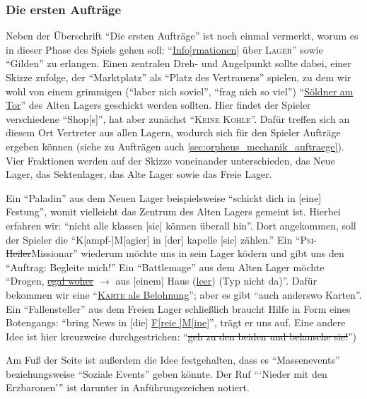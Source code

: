 \documentclass[a5paper,pagesize,numbers=noenddot]{scrbook}
\begin{document}
\subsubsection{Die ersten Aufträge}\label{sec:orpheus_geschichte_abschnitte_auftraege}
Neben der Überschrift \enquote{Die ersten Aufträge} ist noch einmal vermerkt, worum es in dieser Phase des Spiels gehen soll:
\enquote{\uline{Info[rmationen]} über \textsc{Lager}} sowie \enquote{Gilden} zu erlangen.
Einen zentralen Dreh- und Angelpunkt sollte dabei, einer Skizze zufolge, der \enquote{Marktplatz} als \enquote{Platz des Vertrauens} spielen, zu dem wir wohl von einem grimmigen (\enquote{laber nich soviel}, \enquote{frag nich so viel}) \enquote{\uline{Söldner am Tor}} des Alten Lagers geschickt werden sollten.
Hier findet der Spieler verschiedene \enquote{Shop[s]}, hat aber zunächst \enquote{\textsc{Keine Kohle}}.
Dafür treffen sich an diesem Ort Vertreter aus allen Lagern, wodurch sich für den Spieler Aufträge ergeben können (siehe zu Aufträgen auch \autoref{sec:orpheus_mechanik_auftraege}).
Vier Fraktionen werden auf der Skizze voneinander unterschieden, das Neue Lager, das Sektenlager, das Alte Lager sowie das Freie Lager.

Ein \enquote{Paladin} aus dem Neuen Lager beispielsweise \enquote{schickt dich in [eine] Festung}, womit vielleicht das Zentrum des Alten Lagers gemeint ist.
Hierbei erfahren wir:
\enquote{nicht alle klassen [sic] können überall hin}.
Dort angekommen, soll der Spieler die \enquote{K[ampf-]M[agier] in [der] kapelle [sic] zählen.}
Ein \enquote{\textsc{Psi}-\sout{Heiler}Missionar} wiederum möchte uns in sein Lager ködern und gibt uns den \enquote{Auftrag: Begleite mich!}
Ein \enquote{Battlemage} aus dem Alten Lager möchte \enquote{Drogen, \uline{\sout{egal woher}} $\rightarrow$ aus [einem] Haus (\uline{leer}) (Typ nicht da)}.
Dafür bekommen wir eine \enquote{\uline{\textsc{Karte} als Belohnung}}; aber es gibt \enquote{auch anderswo Karten}.
Ein \enquote{Fallensteller} aus dem Freien Lager schließlich braucht Hilfe in Form eines Botengangs:
\enquote{bring News in [die] \uline{F[reie ]M[ine]}}, trägt er uns auf.
Eine andere Idee ist hier kreuzweise durchgestrichen: \enquote{\sout{geh zu den beiden und belausche sie!}})

Am Fuß der Seite ist außerdem die Idee festgehalten, dass es \enquote{Massenevents} beziehungsweise \enquote{Soziale Events} geben könnte.
Der Ruf \enquote{\enquote{Nieder mit den Erzbaronen}} ist darunter in Anführungszeichen notiert.


\end{document}

